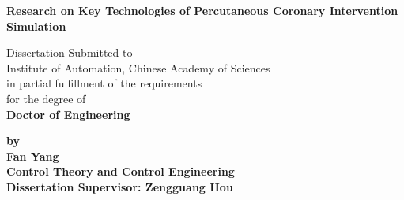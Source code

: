 
\thispagestyle{empty} %

\vspace*{0.5cm} %
\begin{center} \erhao \hei \textsf{\textbf{Research on Key Technologies of Percutaneous Coronary Intervention Simulation}}
\end{center}

\vspace*{0.5cm} %
\begin{center}
\sanhao Dissertation Submitted to\\
Institute of Automation, Chinese Academy of Sciences\\
in partial fulfillment of the requirements\\
for the degree of\\
\textsf{\textbf{Doctor of Engineering}}
\end{center}

\vspace{1.0cm}
\begin{center}
\textsf{\textbf{by}}\\
\textsf{\textbf{Fan Yang}}\\
\textsf{\textbf{Control Theory and Control Engineering}}\\
\vspace{1.0cm} \textsf{\textbf{Dissertation Supervisor: Zengguang Hou}}
\end{center}
